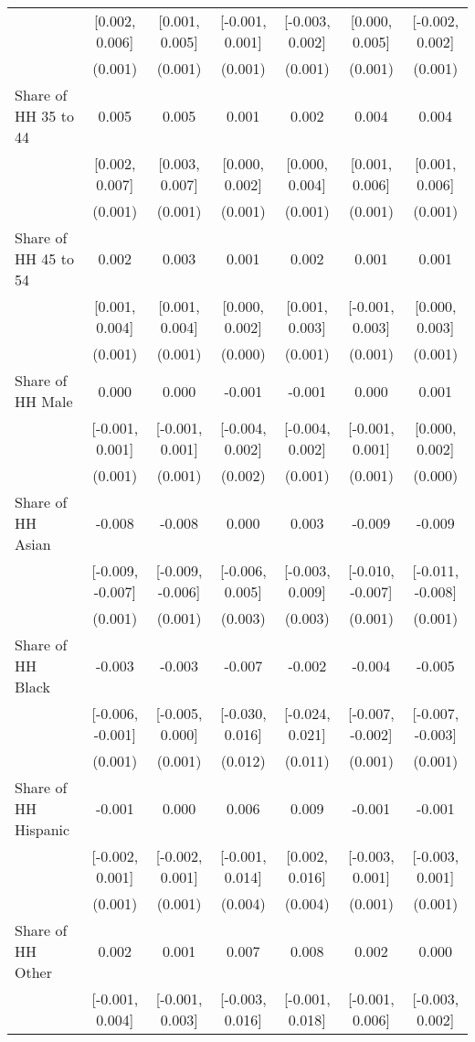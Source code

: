 \begin{table}[H]
\begin{table}[H]
\begin{tabular}[t]{lcccccc}
 & [0.002, 0.006] & [0.001, 0.005] & [-0.001, 0.001] & [-0.003, 0.002] & [0.000, 0.005] & [-0.002, 0.002]\\
 & (0.001) & (0.001) & (0.001) & (0.001) & (0.001) & \vphantom{1} (0.001)\\
Share of HH 35 to 44 & 0.005 & 0.005 & 0.001 & 0.002 & 0.004 & 0.004\\
 & [0.002, 0.007] & [0.003, 0.007] & [0.000, 0.002] & [0.000, 0.004] & [0.001, 0.006] & [0.001, 0.006]\\
 & (0.001) & (0.001) & (0.001) & (0.001) & (0.001) & (0.001)\\
Share of HH 45 to 54 & 0.002 & 0.003 & 0.001 & 0.002 & 0.001 & 0.001\\
 & [0.001, 0.004] & [0.001, 0.004] & [0.000, 0.002] & [0.001, 0.003] & [-0.001, 0.003] & [0.000, 0.003]\\
 & (0.001) & (0.001) & (0.000) & (0.001) & (0.001) & (0.001)\\
Share of HH Male & 0.000 & 0.000 & -0.001 & -0.001 & 0.000 & 0.001\\
 & [-0.001, 0.001] & [-0.001, 0.001] & [-0.004, 0.002] & [-0.004, 0.002] & [-0.001, 0.001] & [0.000, 0.002]\\
 & (0.001) & (0.001) & (0.002) & (0.001) & (0.001) & (0.000)\\
Share of HH Asian & -0.008 & -0.008 & 0.000 & 0.003 & -0.009 & -0.009\\
 & [-0.009, -0.007] & [-0.009, -0.006] & [-0.006, 0.005] & [-0.003, 0.009] & [-0.010, -0.007] & [-0.011, -0.008]\\
 & (0.001) & (0.001) & (0.003) & (0.003) & (0.001) & (0.001)\\
Share of HH Black & -0.003 & -0.003 & -0.007 & -0.002 & -0.004 & -0.005\\
 & [-0.006, -0.001] & [-0.005, 0.000] & [-0.030, 0.016] & [-0.024, 0.021] & [-0.007, -0.002] & [-0.007, -0.003]\\
 & (0.001) & (0.001) & (0.012) & (0.011) & (0.001) & (0.001)\\
Share of HH Hispanic & -0.001 & 0.000 & 0.006 & 0.009 & -0.001 & -0.001\\
 & [-0.002, 0.001] & [-0.002, 0.001] & [-0.001, 0.014] & [0.002, 0.016] & [-0.003, 0.001] & [-0.003, 0.001]\\
 & (0.001) & (0.001) & (0.004) & (0.004) & (0.001) & (0.001)\\
Share of HH Other & 0.002 & 0.001 & 0.007 & 0.008 & 0.002 & 0.000\\
 & [-0.001, 0.004] & [-0.001, 0.003] & [-0.003, 0.016] & [-0.001, 0.018] & [-0.001, 0.006] & [-0.003, 0.002]\\

\end{tabular}
\end{table}
\end{table}
